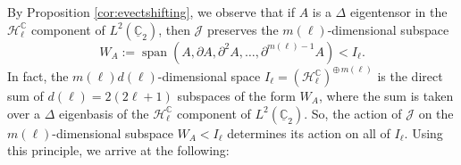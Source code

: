 \documentclass[11pt]{article}
\newcommand{\C}{\mathbb{C}}
\newcommand{\Hc}{\mathcal{H}}
\newcommand{\uC}{\underline{\mathbb{C}}}
\theoremstyle{definition}
\numberwithin{equation}{section}
\begin{document}
\indent By Proposition \ref{cor:evectshifting}, we observe that if $A$ is a $\Delta$ eigentensor in the $\mathcal{H}_\ell^\C$ component of $L^2(\uC_2)$, then $\mathscr{J}$ preserves the $m(\ell)$-dimensional subspace
    \begin{equation} \label{eq:SpecialSubspace}
        W_A := \operatorname{span}(A, \partial A, \partial^2 A, \ldots, \partial^{m(\ell)-1} A) < I_\ell.
    \end{equation}
In fact, the $m(\ell)d(\ell)$-dimensional space $I_\ell = \left(\Hc_\ell^\C\right) ^{\oplus\, m(\ell)}$ is the direct sum of $d(\ell) = 2(2 \ell + 1)$ subspaces of the form $W_A$, where the sum is taken over a $\Delta$ eigenbasis of the $\Hc_\ell^\C$ component of $L^2(\uC_2)$.  So, the action of $\mathscr{J}$ on the $m(\ell)$-dimensional subspace $W_A < I_\ell$ determines its action on all of $I_\ell$.  Using this principle, we arrive at the following:
\end{document}
